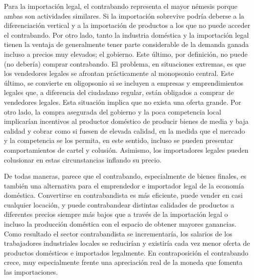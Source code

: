 \documentclass[12pt,letterpaper]{article}
\begin{document}
Para la importación legal, el contrabando representa el mayor némesis porque ambas son actividades similares. Si la importación sobrevive podría deberse a la diferenciación vertical y a la importación de productos a los que no puede acceder el contrabando. Por otro lado, tanto la industria doméstica y la importación legal tienen la ventaja de generalmente tener parte considerable de la demanda ganada incluso a precios muy elevados; el gobierno. Este último, por definición, no puede (no debería) comprar contrabando. El problema, en situaciones extremas, es que los vendedores legales se afrontan prácticamente al monopsonio central. Este último, se convierte en oligopsonio si se incluyen a empresas y emprendimientos legales que, a diferencia del ciudadano regular, están obligados a comprar de vendedores legales. Esta situación implica que no exista una oferta grande. Por otro lado, la compra asegurada del gobierno y la poca competencia local implicarían incentivos al productor doméstico de producir bienes de media y baja calidad y cobrar como si fuesen de elevada calidad, en la medida que el mercado y la competencia se los permita, en este sentido, incluso se pueden presentar comportamientos de cartel y colusión. Asimismo, los importadores legales pueden colusionar en estas circunstancias inflando su precio.

De todas maneras, parece que el contrabando, especialmente de bienes finales, es también una alternativa para el emprendedor e importador legal de la economía doméstica. Convertirse en contrabandista es más eficiente, puede vender en casi cualquier locación, y puede contrabandear distintas calidades de productos a diferentes precios siempre más bajos que a través de la importación legal o incluso la producción doméstica con el espacio de obtener mayores ganancias. Como resultado el sector contrabandista se incrementaría, los salarios de los trabajadores industriales locales se reducirían y existiría cada vez menor oferta de productos domésticos e importados legalmente. En contraposición el contrabando crece, muy especialmente frente una apreciación real de la moneda que fomenta las importaciones.
\end{document}
